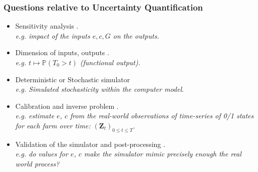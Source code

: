 \documentclass[nopagenumber,9pt]{beamer}
\renewcommand{\P}{\mathbb{P}}
\newcommand{\bZ}{\mathbf{Z}}
\begin{document}
	\begin{frame}
	 \frametitle{Questions relative to Uncertainty Quantification}
	 
	 \begin{itemize}
	  \item Sensitivity analysis \cite{barbillon2015network,ferrer,lecarpentier2019walter}.\\
	   \textit{e.g. impact of the inputs $e,c,G$ on the outputs.}
	   \smallskip
	   
	  \item Dimension of inputs, outputs \cite{ferrer}.\\
	  \textit{e.g. $t\mapsto\P(T_0> t)$ (functional output).} 
	  
	  	   \smallskip

	  \item Deterministic or Stochastic simulator \cite{stosim}\\
	  \textit{e.g. Simulated stochasticity within the computer model}.

	  	   \smallskip

	  \item Calibration and inverse problem \cite{barbillondamblin,metamodmix,carmassiPV}.\\
	  \textit{e.g. estimate $e$, $c$ from the real-world observations of time-series of 0/1 states for each farm over time: $(\bZ_t)_{0\le t\le T}$.}
	   \smallskip

	  
	  \item Validation of the simulator and post-processing \cite{damblin2016bayesian,kaniav,courbariaux2017water,courbariaux2019post}.\\
	  \textit{e.g. do values for $e$, $c$ make the simulator mimic precisely enough the real world process?}
	 \end{itemize}

	 
	 
	\end{frame}

	
	
	
\end{document}
